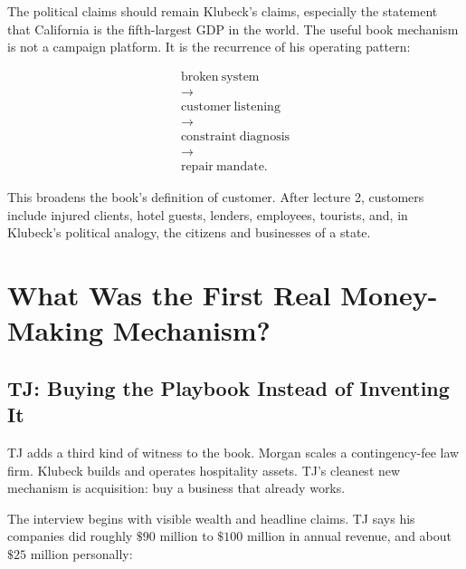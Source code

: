 \documentclass[11pt,oneside]{book}
\begin{document}
The political claims should remain Klubeck's claims, especially the statement that California is the fifth-largest GDP in the world. The useful book mechanism is not a campaign platform. It is the recurrence of his operating pattern:

\begin{equation}
\begin{gathered}
\mathrm{broken\ system}\\
\rightarrow\\
\mathrm{customer\ listening}\\
\rightarrow\\
\mathrm{constraint\ diagnosis}\\
\rightarrow\\
\mathrm{repair\ mandate}.
\end{gathered}
\end{equation}

This broadens the book's definition of customer. After lecture 2, customers include injured clients, hotel guests, lenders, employees, tourists, and, in Klubeck's political analogy, the citizens and businesses of a state.


\chapter{What Was the First Real Money-Making Mechanism?}

\section{TJ: Buying the Playbook Instead of Inventing It}

TJ adds a third kind of witness to the book. Morgan scales a contingency-fee law firm. Klubeck builds and operates hospitality assets. TJ's cleanest new mechanism is acquisition: buy a business that already works.

The interview begins with visible wealth and headline claims. TJ says his companies did roughly \(\$90\) million to \(\$100\) million in annual revenue, and about \(\$25\) million personally:
\end{document}
